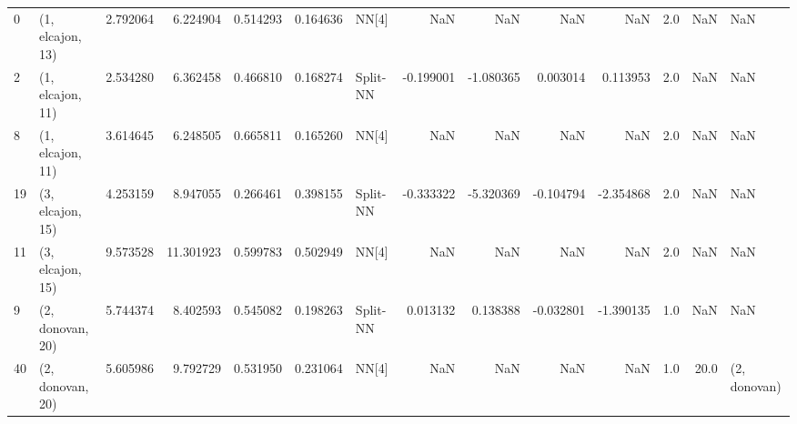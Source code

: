 \begin{tabular}{llrrrrlrrrrrrl}
0  &  (1, elcajon, 13) &   2.792064 &   6.224904 &   0.514293 &  0.164636 &       NN[4] &             NaN &           NaN &            NaN &          NaN &            2.0 &    NaN &              NaN \\
2  &  (1, elcajon, 11) &   2.534280 &   6.362458 &   0.466810 &  0.168274 &    Split-NN &       -0.199001 &     -1.080365 &       0.003014 &     0.113953 &            2.0 &    NaN &              NaN \\
8  &  (1, elcajon, 11) &   3.614645 &   6.248505 &   0.665811 &  0.165260 &       NN[4] &             NaN &           NaN &            NaN &          NaN &            2.0 &    NaN &              NaN \\
19 &  (3, elcajon, 15) &   4.253159 &   8.947055 &   0.266461 &  0.398155 &    Split-NN &       -0.333322 &     -5.320369 &      -0.104794 &    -2.354868 &            2.0 &    NaN &              NaN \\
11 &  (3, elcajon, 15) &   9.573528 &  11.301923 &   0.599783 &  0.502949 &       NN[4] &             NaN &           NaN &            NaN &          NaN &            2.0 &    NaN &              NaN \\
9  &  (2, donovan, 20) &   5.744374 &   8.402593 &   0.545082 &  0.198263 &    Split-NN &        0.013132 &      0.138388 &      -0.032801 &    -1.390135 &            1.0 &    NaN &              NaN \\
40 &  (2, donovan, 20) &   5.605986 &   9.792729 &   0.531950 &  0.231064 &       NN[4] &             NaN &           NaN &            NaN &          NaN &            1.0 &   20.0 &     (2, donovan) \\
\bottomrule
\end{tabular}
